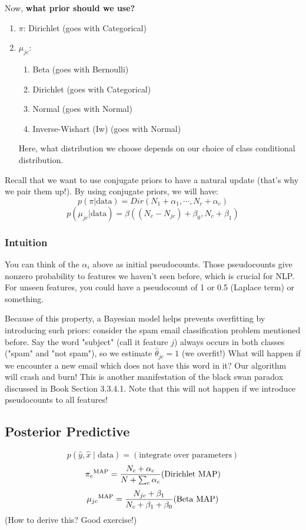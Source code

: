 \documentclass{article}
\begin{document}
Now, \textbf{what prior should we use?}
\begin{enumerate}
    \item $\pi$: Dirichlet (goes with Categorical)
    \item $\mu_{jc}$: 
        \begin{enumerate}
            \item Beta (goes with Bernoulli)
            \item Dirichlet (goes with Categorical)
            \item Normal (goes with Normal)
            \item Inverse-Wishart (Iw) (goes with Normal)
        \end{enumerate}
        Here, what distribution we choose depends on our choice of class conditional distribution.
\end{enumerate} 
Recall that we want to use conjugate priors to have a natural update (that's why we pair them up!). By using conjugate priors, we will have:
    \[ p(\pi | \text{data}) = Dir(N_1 + \alpha_1, \cdots, N_c + \alpha_c) \]
    \[ p(\mu_{jc} | \text{data}) = \beta((N_c - N_{jc}) + \beta_0, N_c + \beta_1) \]
\subsubsection{Intuition}
You can think of the $\alpha_i$ above as initial pseudocounts. Those pseudocounts give nonzero probability to features we haven't seen before, which is crucial for NLP. For unseen features, you could have a pseudocount of 1 or 0.5 (Laplace term) or something. 

Because of this property, a Bayesian model helps prevents overfitting by introducing such priors: consider the spam email classification problem mentioned before. Say the word "subject" (call it feature $j$) always occurs in both classes ("spam" and "not spam"), so we estimate $\hat{\theta}_{jc} = 1$ (we overfit!) What will happen if we encounter a new email which does not have this word in it? Our algorithm will crash and burn! This is another manifestation of the black swan paradox discussed in Book Section 3.3.4.1. Note that this will not happen if we introduce pseudocounts to all features! 
\subsection{Posterior Predictive}
\[p(\hat{y}, \hat{x} \mid \text{data}) = (\text{integrate over parameters})\] 
\[ {\pi_c}^{\operatorname{MAP}} = \frac{N_c + \alpha_c}{N + \sum_c \alpha_c} (\text{Dirichlet MAP}) \] 
\[{\mu_{jc}}^{\operatorname{MAP}} = \frac{N_{jc} + \beta_1}{N_c + \beta_1 + \beta_0} (\text{Beta MAP})\] 
(How to derive this? Good exercise!)
\end{document}
